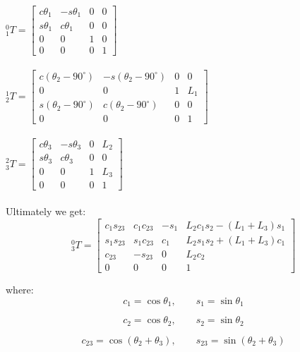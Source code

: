 \documentclass{article}
\begin{document}
${}^{0}_{1}T=
\begin{bmatrix}
c\theta_1 & -s\theta_1 & 0 & 0\\
s\theta_1 & c\theta_1 & 0 & 0\\
0 & 0 & 1 & 0\\
0 & 0 & 0 & 1
\end{bmatrix}$\\\\
${}^{1}_{2}T=
\begin{bmatrix}
c(\theta_2-90^\circ) & -s(\theta_2-90^\circ) & 0 & 0\\
0 & 0 & 1 & L_1\\
s(\theta_2-90^\circ) & c(\theta_2-90^\circ) & 0 & 0\\
0 & 0 & 0 & 1
\end{bmatrix}$\\\\
${}^{2}_{3}T=
\begin{bmatrix}
c\theta_3 & -s\theta_3 & 0 & L_2\\
s\theta_3 & c\theta_3 & 0 & 0\\
0 & 0 & 1 & L_3\\
0 & 0 & 0 & 1
\end{bmatrix}$\\\\

Ultimately we get: 
\[
{}^0_3T =
\begin{bmatrix}
c_1 s_{23} & c_1 c_{23} & -s_1 &
L_2 c_1 s_2 - (L_1 + L_3)s_1
\\[4pt]
s_1 s_{23} & s_1 c_{23} & c_1 &
L_2 s_1 s_2 + (L_1 + L_3)c_1
\\[4pt]
c_{23} & -s_{23} & 0 &
L_2 c_2
\\[4pt]
0 & 0 & 0 & 1
\end{bmatrix}
\]

where: 
\[
c_1 = \cos\theta_1,\qquad
s_1 = \sin\theta_1
\]

\[
c_2 = \cos\theta_2,\qquad
s_2 = \sin\theta_2
\]

\[
c_{23} = \cos(\theta_2+\theta_3),\qquad
s_{23} = \sin(\theta_2+\theta_3)
\]
\end{document}
